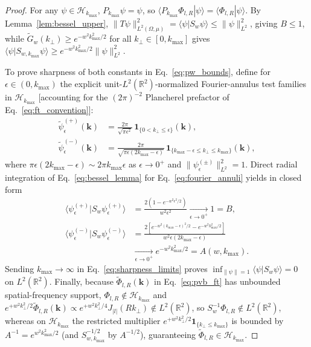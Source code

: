 \documentclass[aps,pra,reprint,nofootinbib,floatfix,longbibliography]{revtex4-2}
\theoremstyle{remark}
\newcommand{\braket}[2]{\langle #1 | #2 \rangle}
\newcommand{\norm}[1]{\lVert #1 \rVert}
\newcommand{\abs}[1]{\lvert #1 \rvert}
\begin{document}
\begin{proof}
For any $\psi \in \mathcal{H}_{k_{\max}}$, $P_{k_{\max}}\psi = \psi$, so $\braket{P_{k_{\max}}\Phi_{l,R}}{\psi} = \braket{\Phi_{l,R}}{\psi}$. By Lemma~\ref{lem:bessel_upper}, $\norm{T\psi}_{L^2(\Omega,\mu)}^2 = \braket{\psi}{S_w\psi} \le \norm{\psi}_{L^2}^2$, giving $B \le 1$, while $\widetilde{G}_w(k_\perp) \ge e^{-w^2 k_{\max}^2/2}$ for all $k_\perp \in [0,k_{\max}]$ gives $\braket{\psi}{S_{w,k_{\max}}\psi} \ge e^{-w^2 k_{\max}^2/2}\norm{\psi}_{L^2}^2$.

To prove sharpness of both constants in Eq.~\eqref{eq:pw_bounds}, define for $\epsilon \in (0,k_{\max})$ the explicit unit-$L^2(\mathbb{R}^2)$-normalized Fourier-annulus test families in $\mathcal{H}_{k_{\max}}$ [accounting for the $(2\pi)^{-2}$ Plancherel prefactor of Eq.~\eqref{eq:ft_convention}]:
\begin{align}
\widetilde{\psi}_\epsilon^{(+)}(\mathbf{k}) &= \frac{2\pi}{\sqrt{\pi\epsilon^2}}\,\mathbf{1}_{\{0 < k_\perp \le \epsilon\}}(\mathbf{k}), \nonumber \\
\widetilde{\psi}_\epsilon^{(-)}(\mathbf{k}) &= \frac{2\pi}{\sqrt{\pi\epsilon(2k_{\max}-\epsilon)}}\,\mathbf{1}_{\{k_{\max}-\epsilon \le k_\perp \le k_{\max}\}}(\mathbf{k}),
\label{eq:fourier_annuli}
\end{align}
where $\pi\epsilon(2k_{\max}-\epsilon) \sim 2\pi k_{\max}\epsilon$ as $\epsilon \to 0^+$ and $\norm{\psi_\epsilon^{(\pm)}}_{L^2}^2 = 1$. Direct radial integration of Eq.~\eqref{eq:bessel_lemma} for Eq.~\eqref{eq:fourier_annuli} yields in closed form
\begin{align}
\braket{\psi_\epsilon^{(+)}}{S_w\psi_\epsilon^{(+)}} &= \frac{2\left(1 - e^{-w^2\epsilon^2/2}\right)}{w^2\epsilon^2} \xrightarrow[\epsilon\to 0^+]{} 1 = B, \nonumber \\
\braket{\psi_\epsilon^{(-)}}{S_w\psi_\epsilon^{(-)}} &= \frac{2\left[e^{-w^2(k_{\max}-\epsilon)^2/2} - e^{-w^2 k_{\max}^2/2}\right]}{w^2\epsilon(2k_{\max}-\epsilon)} \nonumber \\
&\xrightarrow[\epsilon\to 0^+]{} e^{-w^2 k_{\max}^2/2} = A(w,k_{\max}).
\label{eq:sharpness_limits}
\end{align}
Sending $k_{\max} \to \infty$ in Eq.~\eqref{eq:sharpness_limits} proves $\inf_{\norm{\psi}=1}\braket{\psi}{S_w\psi} = 0$ on $L^2(\mathbb{R}^2)$. Finally, because $\widetilde{\Phi}_{l,R}(\mathbf{k})$ in Eq.~\eqref{eq:pvb_ft} has unbounded spatial-frequency support, $\Phi_{l,R} \notin \mathcal{H}_{k_{\max}}$ and $e^{+w^2 k_\perp^2/2}\widetilde{\Phi}_{l,R}(\mathbf{k}) \propto e^{+w^2 k_\perp^2/4} J_{\abs{l}}(Rk_\perp) \notin L^2(\mathbb{R}^2)$, so $S_w^{-1}\Phi_{l,R} \notin L^2(\mathbb{R}^2)$, whereas on $\mathcal{H}_{k_{\max}}$ the restricted multiplier $e^{+w^2 k_\perp^2/2}\mathbf{1}_{\{k_\perp \le k_{\max}\}}$ is bounded by $A^{-1} = e^{w^2 k_{\max}^2/2}$ (and $S_{w,k_{\max}}^{-1/2}$ by $A^{-1/2}$), guaranteeing $\widetilde{\Phi}_{l,R} \in \mathcal{H}_{k_{\max}}$.
\end{proof}
\end{document}
